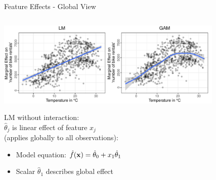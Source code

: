 \documentclass[10pt,compress,t,notes=noshow, xcolor=table]{beamer}
\begin{document}


\begin{frame}{Feature Effects - Global View}

\begin{columns}[T, totalwidth=\textwidth]
\begin{column}{0.49\linewidth}
\includegraphics[width=0.85\textwidth, trim=0cm 0.1cm 10.4cm 0cm, clip]{figure/lm_main_effects}

\bigskip
LM without interaction:\\ $\hat\theta_j$ is linear effect of feature $x_j$\\ (applies globally to all observations):
\medskip
\begin{itemize}
    \item Model equation: $\hat{f}(\mathbf{x}) = \hat\theta_0 + x_1\hat\theta_1$
    \item Scalar $\hat\theta_1$ describes global effect
\end{itemize}
\end{column}\pause
\begin{column}{0.51\linewidth}


\end{column}
\end{columns}
\end{frame}
\end{document}
